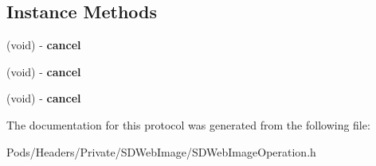 \subsection*{Instance Methods}
\begin{DoxyCompactItemize}
\item 
\mbox{\label{protocol_s_d_web_image_operation_01-p_ab9619f84b4167712c8bec132da3e8e02}} 
(void) -\/ {\bfseries cancel}
\item 
\mbox{\label{protocol_s_d_web_image_operation_01-p_ab9619f84b4167712c8bec132da3e8e02}} 
(void) -\/ {\bfseries cancel}
\item 
\mbox{\label{protocol_s_d_web_image_operation_01-p_ab9619f84b4167712c8bec132da3e8e02}} 
(void) -\/ {\bfseries cancel}
\end{DoxyCompactItemize}


The documentation for this protocol was generated from the following file\+:\begin{DoxyCompactItemize}
\item 
Pods/\+Headers/\+Private/\+S\+D\+Web\+Image/S\+D\+Web\+Image\+Operation.\+h\end{DoxyCompactItemize}
